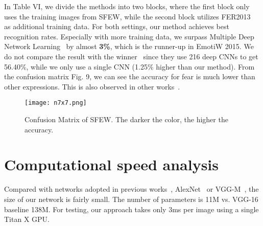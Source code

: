 \documentclass[a4paper, 10pt, conference]{ieeeconf}      %
\begin{document}
In Table VI, we divide the methods into two blocks, where the first block only uses the training images from SFEW, while the second block utilizes FER2013~\cite{goodfellow2013challenges} as additional training data.
For both settings, our method achieves best recognition rates. Especially with more training data, we surpass Multiple Deep Network Learning~\cite{yu2015image} by almost \textbf{3\%}, which is the runner-up in EmotiW 2015. We do not compare the result with the winner~\cite{kim2016hierarchical} since they use 216 deep CNNs to get 56.40\%, while we only use a single CNN (1.25\% higher than our method). From the confusion matrix Fig. 9, we can see the accuracy for fear is much lower than other expressions. This is also observed in other works~\cite{ng2015deep}. 

\begin{figure}[!ht]
  \centering
  \texttt{[image: n7x7.png]}
  \caption{Confusion Matrix of SFEW. The darker the color, the higher the accuracy.}
  \label{figurelabel}
  \vspace{-1mm}
\end{figure}


%
%
%
%
%





\section{Computational speed analysis}
Compared with networks adopted in previous works~\cite{ng2015deep, mollahosseini2016going, zhao2016peak}, AlexNet~\cite{krizhevsky2012imagenet} or  VGG-M~\cite{chatfield2014return}, the size of our network is fairly small. The number of parameters is 11M vs. VGG-16 baseline 138M. For testing, our approach takes only 3ms per image using a single Titan X GPU. 
\end{document}
